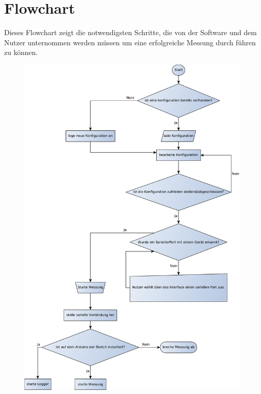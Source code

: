 \section{Flowchart}
Dieses Flowchart zeigt die notwendigsten Schritte, die von der Software und dem Nutzer unternommen werden müssen um eine erfolgreiche Messung durch führen zu können. 
\begin{figure}[H]
 \centering
 \includegraphics[width=\textwidth, keepaspectratio=true]{../Diagramme/SoftwareFlowChart.pdf}
\end{figure}
